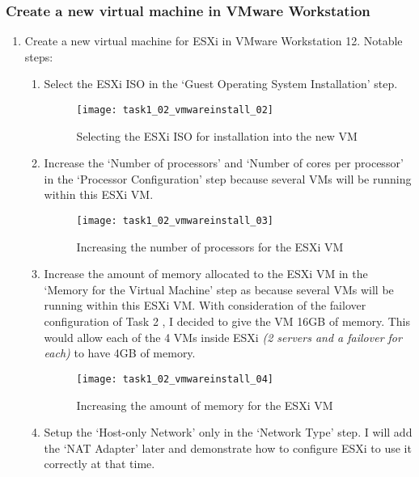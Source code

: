 \subsubsection*{Create a new virtual machine in VMware Workstation}
\begin{enumerate}[resume*=task1methodology]
  \item Create a new virtual machine for ESXi in VMware Workstation 12. Notable steps:
    \begin{enumerate}[label=\alph*)]
      \item Select the ESXi ISO in the `Guest Operating System Installation' step.
        \begin{figure}[H]
          \centering
          \captionsetup{skip=2pt}
          \texttt{[image: task1\_02\_vmwareinstall\_02]}
          \caption{Selecting the ESXi ISO for installation into the new VM}
          \label{fig:task1:02_vmwarewiz_02}
        \end{figure}
      \item Increase the `Number of processors' and `Number of cores per processor' in the `Processor Configuration' step because several VMs will be running within this ESXi VM.
        \begin{figure}[H]
          \centering
          \captionsetup{skip=2pt}
          \texttt{[image: task1\_02\_vmwareinstall\_03]}
          \caption{Increasing the number of processors for the ESXi VM}
          \label{fig:task1:02_vmwarewiz_03}
        \end{figure}
      \item Increase the amount of memory allocated to the ESXi VM in the `Memory for the Virtual Machine' step as because several VMs will be running within this ESXi VM. With consideration of the failover configuration of Task 2 , I decided to give the VM 16GB of memory. This would allow each of the 4 VMs inside ESXi \textit{(2 servers and a failover for each)} to have 4GB of memory.
        \begin{figure}[H]
          \centering
          \captionsetup{skip=2pt}
          \texttt{[image: task1\_02\_vmwareinstall\_04]}
          \caption{Increasing the amount of memory for the ESXi VM}
          \label{fig:task1:02_vmwarewiz_04}
        \end{figure}
      \item Setup the `Host-only Network' only in the `Network Type' step. I will add the `NAT Adapter' later and demonstrate how to configure ESXi to use it correctly at that time.

\end{enumerate}
\end{enumerate}
